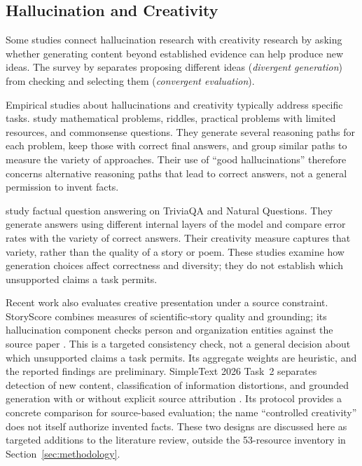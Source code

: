 \documentclass{clv2025}
\begin{document}
\subsection{Hallucination and Creativity}

Some studies connect hallucination research with creativity research by
asking whether generating content beyond established evidence can help
produce new ideas. The survey by \citet{jiang_survey_2024} separates
proposing different ideas (\emph{divergent generation}) from checking and
selecting them (\emph{convergent evaluation}).

Empirical studies about hallucinations and creativity typically address specific tasks. \citet{sun_hallucinating_2024}
study mathematical problems, riddles, practical problems with limited
resources, and commonsense questions. They generate several reasoning paths
for each problem, keep those with correct final answers, and group similar
paths to measure the variety of approaches. Their use of ``good
hallucinations'' therefore concerns alternative reasoning paths that lead
to correct answers, not a general permission to invent facts.

\citet{he_shakespearean_2025} study factual question answering on TriviaQA
and Natural Questions. They generate answers using different internal
layers of the model and compare error rates with the variety of correct
answers. Their creativity measure captures that variety, rather than the
quality of a story or poem. These studies examine how generation choices
affect correctness and diversity; they do not establish which unsupported
claims a task permits.

Recent work also evaluates creative presentation under a source constraint.
StoryScore combines measures of scientific-story quality and grounding; its
hallucination component checks person and organization entities against the
source paper \citep{argese_storyscore_2026}. This is a targeted consistency
check, not a general decision about which unsupported claims a task permits.
Its aggregate weights are heuristic, and the reported findings are preliminary.
SimpleText 2026 Task~2 separates detection of new content, classification of
information distortions, and grounded generation with or without explicit
source attribution \citep{simpletext_task2_2026}. Its protocol provides a
concrete comparison for source-based evaluation; the name ``controlled
creativity'' does not itself authorize invented facts. These two designs
are discussed here as targeted additions to the literature review, outside
the 53-resource inventory in Section~\ref{sec:methodology}.
\end{document}

